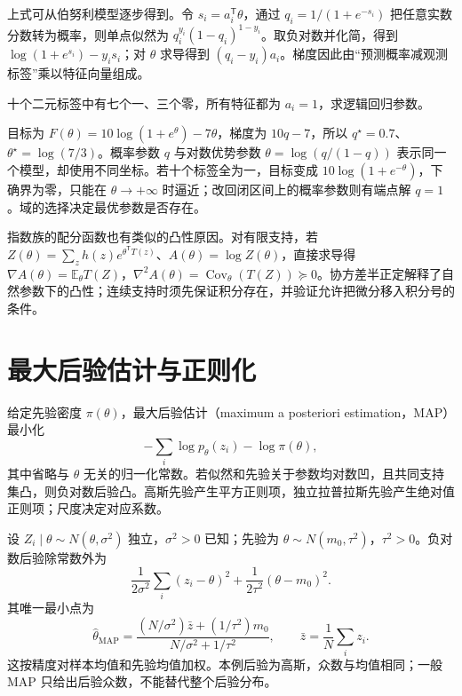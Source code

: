 上式可从伯努利模型逐步得到。令 $s_i=a_i^{\mathsf T}\theta$，通过 $q_i=1/(1+e^{-s_i})$ 把任意实数分数转为概率，则单点似然为 $q_i^{y_i}(1-q_i)^{1-y_i}$。取负对数并化简，得到 $\log(1+e^{s_i})-y_i s_i$；对 $\theta$ 求导得到 $(q_i-y_i)a_i$。梯度因此由“预测概率减观测标签”乘以特征向量组成。

\begin{example}[只有截距的逻辑回归]
十个二元标签中有七个一、三个零，所有特征都为 $a_i=1$，求逻辑回归参数。
\end{example}
\begin{solve}
目标为 $F(\theta)=10\log(1+e^\theta)-7\theta$，梯度为 $10q-7$，所以 $q^\star=0.7$、$\theta^\star=\log(7/3)$。概率参数 $q$ 与对数优势参数 $\theta=\log(q/(1-q))$ 表示同一个模型，却使用不同坐标。若十个标签全为一，目标变成 $10\log(1+e^{-\theta})$，下确界为零，只能在 $\theta\to+\infty$ 时逼近；改回闭区间上的概率参数则有端点解 $q=1$。域的选择决定最优参数是否存在。
\end{solve}

指数族的配分函数也有类似的凸性原因。对有限支持，若 $Z(\theta)=\sum_z h(z)e^{\theta^{\mathsf T}T(z)}$、$A(\theta)=\log Z(\theta)$，直接求导得 $\nabla A(\theta)=\mathbb E_\theta T(Z)$，$\nabla^2 A(\theta)=\operatorname{Cov}_\theta(T(Z))\succeq0$。协方差半正定解释了自然参数下的凸性；连续支持时须先保证积分存在，并验证允许把微分移入积分号的条件。

\section{最大后验估计与正则化}

给定先验密度 $\pi(\theta)$，最大后验估计（maximum a posteriori estimation，MAP）最小化
\[
 -\sum_i\log p_\theta(z_i)-\log\pi(\theta),
\]
其中省略与 $\theta$ 无关的归一化常数。若似然和先验关于参数均对数凹，且共同支持集凸，则负对数后验凸。高斯先验产生平方正则项，独立拉普拉斯先验产生绝对值正则项；尺度决定对应系数。

\begin{example}
设 $Z_i\mid\theta\sim N(\theta,\sigma^2)$ 独立，$\sigma^2>0$ 已知；先验为 $\theta\sim N(m_0,\tau^2)$，$\tau^2>0$。负对数后验除常数外为
\[
 \frac1{2\sigma^2}\sum_i(z_i-\theta)^2+\frac1{2\tau^2}(\theta-m_0)^2.
\]
其唯一最小点为
\[
 \widehat\theta_{\mathrm{MAP}}
 =\frac{(N/\sigma^2)\bar z+(1/\tau^2)m_0}{N/\sigma^2+1/\tau^2},
 \qquad \bar z=\frac1N\sum_i z_i.
\]
这按精度对样本均值和先验均值加权。本例后验为高斯，众数与均值相同；一般 MAP 只给出后验众数，不能替代整个后验分布。
\end{example}

